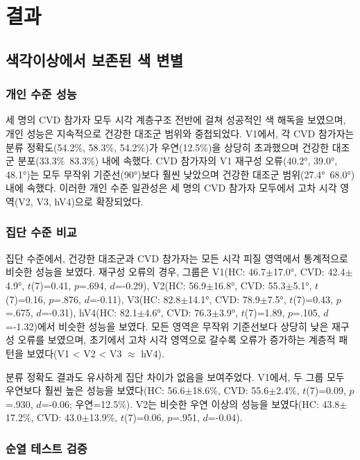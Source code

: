 \documentclass[12pt,a4paper]{article}
\begin{document}
\section{결과}

\subsection{색각이상에서 보존된 색 변별}

\subsubsection{개인 수준 성능}

세 명의 CVD 참가자 모두 시각 계층구조 전반에 걸쳐 성공적인 색 해독을 보였으며, 개인 성능은 지속적으로 건강한 대조군 범위와 중첩되었다. V1에서, 각 CVD 참가자는 분류 정확도(54.2\%, 58.3\%, 54.2\%)가 우연(12.5\%)을 상당히 초과했으며 건강한 대조군 분포(33.3\%~83.3\%) 내에 속했다. CVD 참가자의 V1 재구성 오류(40.2°, 39.0°, 48.1°)는 모두 무작위 기준선(90°)보다 훨씬 낮았으며 건강한 대조군 범위(27.4°~68.0°) 내에 속했다. 이러한 개인 수준 일관성은 세 명의 CVD 참가자 모두에서 고차 시각 영역(V2, V3, hV4)으로 확장되었다.

\subsubsection{집단 수준 비교}

집단 수준에서, 건강한 대조군과 CVD 참가자는 모든 시각 피질 영역에서 통계적으로 비슷한 성능을 보였다. 재구성 오류의 경우, 그룹은 V1(HC: 46.7$\pm$17.0°, CVD: 42.4$\pm$4.9°, $t$(7)=0.41, $p$=.694, $d$=-0.29), V2(HC: 56.9$\pm$16.8°, CVD: 55.3$\pm$5.1°, $t$(7)=0.16, $p$=.876, $d$=-0.11), V3(HC: 82.8$\pm$14.1°, CVD: 78.9$\pm$7.5°, $t$(7)=0.43, $p$=.675, $d$=-0.31), hV4(HC: 82.1$\pm$4.6°, CVD: 76.3$\pm$3.9°, $t$(7)=1.89, $p$=.105, $d$=-1.32)에서 비슷한 성능을 보였다. 모든 영역은 무작위 기준선보다 상당히 낮은 재구성 오류를 보였으며, 초기에서 고차 시각 영역으로 갈수록 오류가 증가하는 계층적 패턴을 보였다(V1 < V2 < V3 $\approx$ hV4).

분류 정확도 결과도 유사하게 집단 차이가 없음을 보여주었다. V1에서, 두 그룹 모두 우연보다 훨씬 높은 성능을 보였다(HC: 56.6$\pm$18.6\%, CVD: 55.6$\pm$2.4\%, $t$(7)=0.09, $p$=.930, $d$=-0.06; 우연=12.5\%). V2는 비슷한 우연 이상의 성능을 보였다(HC: 43.8$\pm$17.2\%, CVD: 43.0$\pm$13.9\%, $t$(7)=0.06, $p$=.951, $d$=-0.04).

\subsubsection{순열 테스트 검증}
\end{document}
